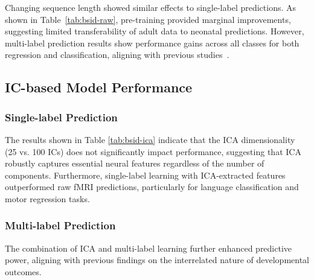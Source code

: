 \documentclass[runningheads,a4paper]{llncs}
\begin{document}
Changing sequence length showed similar effects to single-label predictions. As shown in Table~\ref{tab:bsid-raw}, pre-training provided marginal improvements, suggesting limited transferability of adult data to neonatal predictions. However, multi-label prediction results show performance gains across all classes for both regression and classification, aligning with previous studies~\cite{He2020}.

\subsection{IC-based Model Performance}
\subsubsection{Single-label Prediction}
The results shown in Table \ref{tab:bsid-ica} indicate that the ICA dimensionality (25 vs. 100 ICs) does not significantly impact performance, suggesting that ICA robustly captures essential neural features regardless of the number of components. Furthermore, single-label learning with ICA-extracted features outperformed raw fMRI predictions, particularly for language classification and motor regression tasks.
%
\subsubsection{Multi-label Prediction}
The combination of ICA and multi-label learning further enhanced predictive power, aligning with previous findings on the interrelated nature of developmental outcomes.
\end{document}
